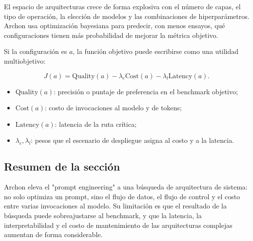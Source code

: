 
El espacio de arquitecturas crece de forma explosiva con el número de capas, el tipo de operación, la elección de modelos y las combinaciones de hiperparámetros. Archon usa optimización bayesiana para predecir, con menos ensayos, qué configuraciones tienen más probabilidad de mejorar la métrica objetivo.


Si la configuración es $a$, la función objetivo puede escribirse como una utilidad multiobjetivo:

$$
J(a)=\mathrm{Quality}(a)-\lambda_c\mathrm{Cost}(a)-\lambda_l\mathrm{Latency}(a).
$$

\begin{itemize}
    \item $\mathrm{Quality}(a)$: precisión o puntaje de preferencia en el benchmark objetivo;
    \item $\mathrm{Cost}(a)$: costo de invocaciones al modelo y de tokens;
    \item $\mathrm{Latency}(a)$: latencia de la ruta crítica;
    \item $\lambda_c,\lambda_l$: pesos que el escenario de despliegue asigna al costo y a la latencia.
\end{itemize}


\subsection{Resumen de la sección}

Archon eleva el "prompt engineering" a una búsqueda de arquitectura de sistema: no solo optimiza un prompt, sino el flujo de datos, el flujo de control y el costo entre varias invocaciones al modelo. Su limitación es que el resultado de la búsqueda puede sobreajustarse al benchmark, y que la latencia, la interpretabilidad y el costo de mantenimiento de las arquitecturas complejas aumentan de forma considerable.
